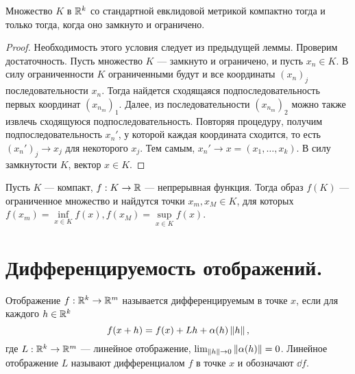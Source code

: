 \documentclass[a4paper]{article}
\theoremstyle{named}
\begin{document}
    \begin{proposal*}
        Множество $K$ в $\mathbb{R}^k$ со стандартной евклидовой метрикой компактно тогда и только тогда, когда оно замкнуто и ограничено.
    \end{proposal*}

    \begin{proof}
        Необходимость этого условия следует из предыдущей леммы. Проверим достаточность. Пусть множество $K$ --- замкнуто и ограничено, и пусть $x_n \in K$. В силу ограниченности $K$ ограниченными будут и все координаты $(x_n)_j$ последовательности $x_n$. Тогда найдется сходящаяся подпоследовательность первых координат $(x_{n_m})_1$. Далее, из последовательности $(x_{n_m})_2$ можно также извлечь сходящуюся подпоследовательность. Повторяя процедуру, получим подпоследовательность $x_n'$, у которой каждая координата сходится, то есть $(x_n')_j \to x_j$ для некоторого $x_j$. Тем самым, $x_n' \to x = (x_1, \dots, x_k)$. В силу замкнутости $K$, вектор $x \in K$.
    \end{proof}

    \begin{consequence*}
        Пусть $K$ --- компакт, $f: K \to \mathbb{R}$ --- непрерывная функция. Тогда образ $f(K)$ --- ограниченное множество и найдутся точки $x_m, x_M \in K$, для которых $f(x_m) = \inf\limits_{x \in K} f(x), f(x_M) = \sup\limits_{x \in K} f(x)$.
    \end{consequence*}

    \section{Дифференцируемость отображений.}

    \begin{definition*}
        Отображение $f: \mathbb{R}^k \to \mathbb{R}^m$ называется дифференцируемым в точке $x$, если для каждого $h \in \mathbb{R}^k$
        \begin{equation*}
            f(x + h) = f(x) + Lh + \alpha(h) \left\lVert h\right\rVert,
        \end{equation*}
        где $L: \mathbb{R}^k \to \mathbb{R}^m$ --- линейное отображение, $\lim_{\left\lVert h\right\rVert \to 0} \left\lVert\alpha(h)\right\rVert = 0$. Линейное отображение $L$ называют дифференциалом $f$ в точке $x$ и обозначают $\dd f$.
    \end{definition*}
\end{document}
